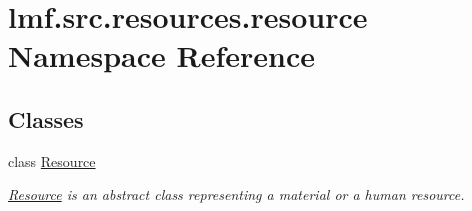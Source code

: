 \hypertarget{namespacelmf_1_1src_1_1resources_1_1resource}{\section{lmf.\+src.\+resources.\+resource Namespace Reference}
\label{namespacelmf_1_1src_1_1resources_1_1resource}
}
\subsection*{Classes}
\begin{DoxyCompactItemize}
\item 
class \hyperlink{classlmf_1_1src_1_1resources_1_1resource_1_1_resource}{Resource}
\begin{DoxyCompactList}\small\item\em \hyperlink{classlmf_1_1src_1_1resources_1_1resource_1_1_resource}{Resource} is an abstract class representing a material or a human resource. \end{DoxyCompactList}\end{DoxyCompactItemize}
